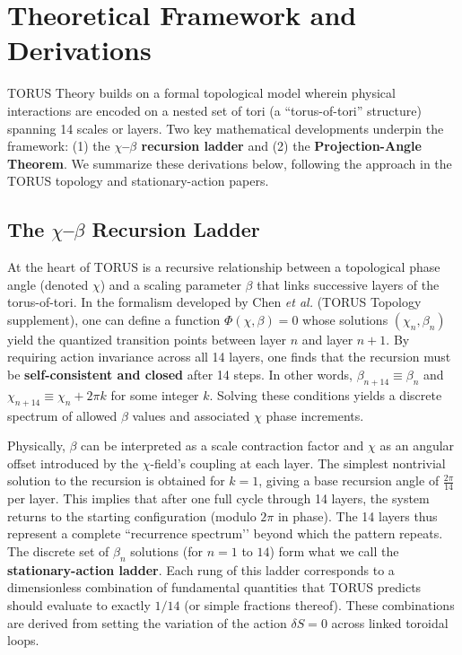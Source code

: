 \documentclass[12pt]{article}
\begin{document}
\section{Theoretical Framework and Derivations}\label{sec:derivation}
TORUS Theory builds on a formal topological model wherein physical interactions are encoded on a nested set of tori (a “torus-of-tori” structure) spanning 14 scales or layers. Two key mathematical developments underpin the framework: (1) the \textbf{$\chi$–$\beta$ recursion ladder} and (2) the \textbf{Projection-Angle Theorem}. We summarize these derivations below, following the approach in the TORUS topology and stationary-action papers.

\subsection{The $\chi$–$\beta$ Recursion Ladder}
At the heart of TORUS is a recursive relationship between a topological phase angle (denoted $\chi$) and a scaling parameter $\beta$ that links successive layers of the torus-of-tori. In the formalism developed by Chen \emph{et al.} (TORUS Topology supplement), one can define a function $\Phi(\chi,\beta)=0$ whose solutions $(\chi_n,\beta_n)$ yield the quantized transition points between layer $n$ and layer $n+1$. By requiring action invariance across all 14 layers, one finds that the recursion must be \textbf{self-consistent and closed} after 14 steps. In other words, $\beta_{n+14} \equiv \beta_n$ and $\chi_{n+14} \equiv \chi_n + 2\pi k$ for some integer $k$. Solving these conditions yields a discrete spectrum of allowed $\beta$ values and associated $\chi$ phase increments.

Physically, $\beta$ can be interpreted as a scale contraction factor and $\chi$ as an angular offset introduced by the $\chi$-field’s coupling at each layer. The simplest nontrivial solution to the recursion is obtained for $k=1$, giving a base recursion angle of $\frac{2\pi}{14}$ per layer. This implies that after one full cycle through 14 layers, the system returns to the starting configuration (modulo $2\pi$ in phase). The 14 layers thus represent a complete “recurrence spectrum’’ beyond which the pattern repeats. The discrete set of $\beta_n$ solutions (for $n=1$ to $14$) form what we call the \textbf{stationary-action ladder}. Each rung of this ladder corresponds to a dimensionless combination of fundamental quantities that TORUS predicts should evaluate to exactly $1/14$ (or simple fractions thereof). These combinations are derived from setting the variation of the action $\delta S=0$ across linked toroidal loops.
\end{document}
